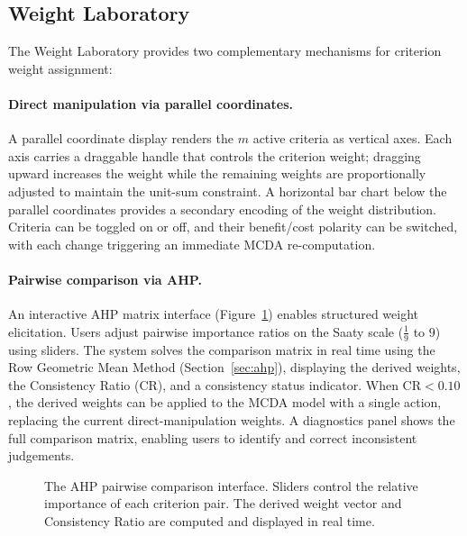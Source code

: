 \subsection{Weight Laboratory}
\label{sec:weight-lab}

The Weight Laboratory provides two complementary mechanisms for criterion weight assignment:

\paragraph{Direct manipulation via parallel coordinates.}
A parallel coordinate display renders the $m$ active criteria as vertical axes. Each axis carries a draggable handle that controls the criterion weight; dragging upward increases the weight while the remaining weights are proportionally adjusted to maintain the unit-sum constraint. A horizontal bar chart below the parallel coordinates provides a secondary encoding of the weight distribution. Criteria can be toggled on or off, and their benefit/cost polarity can be switched, with each change triggering an immediate MCDA re-computation.

\paragraph{Pairwise comparison via AHP.}
An interactive AHP matrix interface (Figure~\ref{fig:ahp-interface}) enables structured weight elicitation. Users adjust pairwise importance ratios on the Saaty scale ($\tfrac{1}{9}$ to $9$) using sliders. The system solves the comparison matrix in real time using the Row Geometric Mean Method (Section~\ref{sec:ahp}), displaying the derived weights, the Consistency Ratio (CR), and a consistency status indicator. When $\text{CR} < 0.10$, the derived weights can be applied to the MCDA model with a single action, replacing the current direct-manipulation weights. A diagnostics panel shows the full comparison matrix, enabling users to identify and correct inconsistent judgements.

\begin{figure}[htbp]
    \centering
    \caption{The AHP pairwise comparison interface. Sliders control the relative importance of each criterion pair. The derived weight vector and Consistency Ratio are computed and displayed in real time.}
    \label{fig:ahp-interface}
\end{figure}

